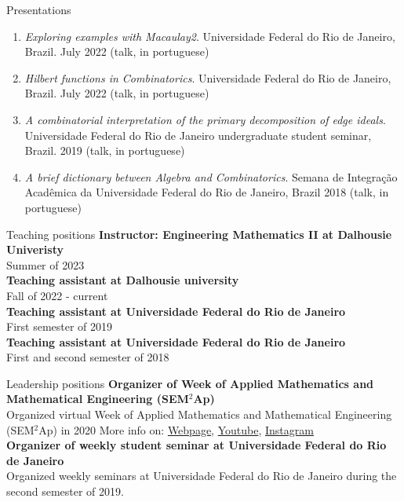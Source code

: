 \documentclass[12pt]{resume} %
\begin{document}
\begin{rSection}{Presentations}
\begin{enumerate}
        \item \textit{Exploring examples with Macaulay2}. Universidade Federal do Rio de Janeiro, Brazil. July 2022 (talk, in portuguese)
        \item \textit{Hilbert functions in Combinatorics}. Universidade Federal do Rio de Janeiro, Brazil. July 2022 (talk, in portuguese)
        \item \textit{A combinatorial interpretation of the primary decomposition of edge ideals}. Universidade Federal do Rio de Janeiro undergraduate student seminar, Brazil. 2019 (talk, in portuguese)
        \item \textit{A brief dictionary between Algebra and Combinatorics}. Semana de Integração Acadêmica da Universidade Federal do Rio de Janeiro, Brazil 2018 (talk, in portuguese)
    \end{enumerate}
\end{rSection}


\begin{rSection}{Teaching positions}
    {\bf Instructor: Engineering Mathematics II at Dalhousie Univeristy}
    \\
    Summer of 2023
    \\
    {\bf Teaching assistant at Dalhousie university}
    \\
    Fall of 2022 - current
    \\
    {\bf Teaching assistant at Universidade Federal do Rio de Janeiro} 
    \\
    First semester of 2019
    \\
    {\bf Teaching assistant at Universidade Federal do Rio de Janeiro} 
    \\
    First and second semester of 2018
    \\
        
\end{rSection}

\begin{rSection}{Leadership positions}
{\bf Organizer of Week of Applied Mathematics and Mathematical Engineering (SEM$^2$Ap)}
\\
Organized virtual Week of Applied Mathematics and Mathematical Engineering (SEM$^2$Ap) in 2020
{\scriptsize More info on:  \href{http://semap.rio.br/2020/en/}{Webpage},   \href{https://www.youtube.com/channel/UC14NMQ5cOsSuLrAQGGa2T4Q}{Youtube}, 
\href{https://www.instagram.com/semap.rio/}{Instagram}}
\\
{\bf Organizer of weekly student seminar at Universidade Federal do Rio de Janeiro}
\\
Organized weekly seminars at Universidade Federal do Rio de Janeiro during the second semester of 2019.
\end{rSection}
\end{document}
